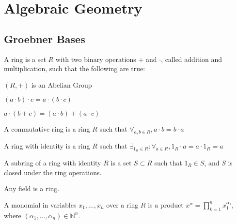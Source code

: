 \documentclass[crop=false,class=article,oneside]{standalone}
\begin{document}
    \ifx\ifmathcoursesalgebraicgeometry\undefined
        \section*{Algebraic Geometry}
        \setcounter{section}{1}
    \fi
    \subsection{Groebner Bases}
        \begin{definition}
            A ring is a set $R$ with two binary operations $+$
            and $\cdot$, called addition and multiplication,
            such that the following are true:
            \begin{enumerate}
                \begin{multicols}{3}
                    \item $(R,+)$ is an Abelian Group
                    \item $(a\cdot{b})\cdot{c}=a\cdot(b\cdot{c})$
                    \item $a\cdot(b+c)=(a\cdot b)+(a\cdot c)$
                \end{multicols}
            \end{enumerate}
        \end{definition}
        \begin{definition}
            A commutative ring is a ring $R$ such that
            $\forall_{a,b\in R},a\cdot{b}=b\cdot{a}$
        \end{definition}
        \begin{definition}
            A ring with identity is a ring $R$ such that
            $\exists_{1_{R}\in R}:\forall_{a\in R}, 1_{R}\cdot a=a\cdot 1_{R}=a$
        \end{definition}
        \begin{definition}
            A subring of a ring with identity $R$ is a set
            $S\subset R$ such that $1_{R}\in S$, and $S$ is
            closed under the ring operations.
        \end{definition}
        \begin{remark}
            Any field is a ring.
        \end{remark}
        \begin{definition}
            A monomial in variables $x_1,\hdots, x_n$ over a
            ring $R$ is a product
            $x^\alpha=\prod_{k=1}^{n} x_1^{\alpha_1}$,
            where $(\alpha_1,\hdots,\alpha_n)\in \mathbb{N}^n$.
        \end{definition}
\end{document}
